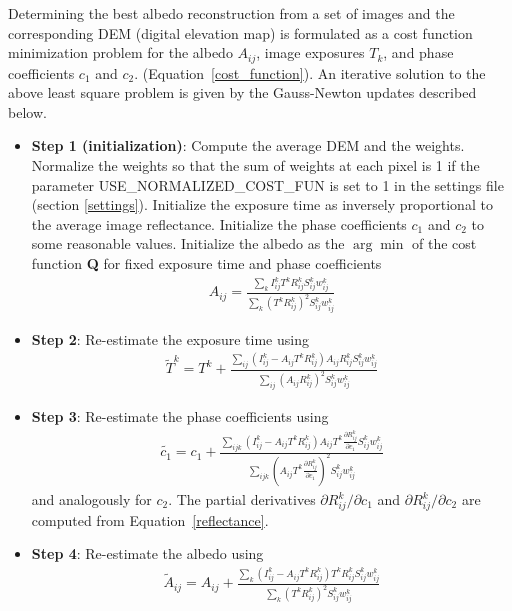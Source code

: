 \documentclass[letterpaper,fleqn,11pt]{report}
\begin{document}
Determining the best albedo reconstruction from a set of images and
the corresponding DEM (digital elevation map) is formulated as a cost function minimization
problem for the albedo $A_{ij}$, image exposures $T_k$, and phase
coefficients $c_1$ and $c_2.$ (Equation~\ref{cost_function}). An iterative solution to the above least square problem is given by the Gauss-Newton updates described below. 

\begin{itemize}
\item {\bf Step 1 (initialization)}: Compute the average DEM and the weights.
Normalize the weights so that the sum of weights at each pixel is 1 if the
parameter USE\_NORMALIZED\_COST\_FUN is set to 1 in the settings file
(section \ref{settings}). 
  Initialize the exposure time as inversely proportional to the average image
  reflectance. Initialize the phase coefficients $c_1$ and $c_2$ to some
  reasonable values. Initialize the albedo as the $\arg \min$ of the
  cost function {\bf Q} for fixed exposure time and phase
  coefficients 
\begin{eqnarray}
A_{ij} = \frac{\sum_k I_{ij}^k T^kR^k_{ij} S^k_{ij}w^k_{ij}}{\sum_k (T^k R^k_{ij})^2 S^k_{ij}w^k_{ij}}
\label{albedo_init}
\end{eqnarray}

\item {\bf Step 2}: Re-estimate the exposure time using
\begin{eqnarray}
\tilde{T} ^k = T^k + \frac{\sum_{ij} (I_{ij}^k-A_{ij}T^kR^k_{ij})A_{ij}R^k_{ij}S^k_{ij}w^k_{ij}}{\sum_{ij}(A_{ij} R^k_{ij})^2 S^k_{ij}w^k_{ij}}
\label{exposure_iter}
\end {eqnarray}

\item {\bf Step 3}: Re-estimate the phase coefficients using
\begin{eqnarray}
\tilde{c_1} = c_1 + \frac{\sum_{ijk}
  (I_{ij}^k-A_{ij}T^kR^k_{ij})A_{ij}T^k \frac{\partial R^k_{ij}}{\partial c_1}S^k_{ij}w^k_{ij}}{\sum_{ijk}\left(A_{ij}T^k\frac{\partial R^k_{ij}}{\partial c_1}\right)^2 S^k_{ij}w^k_{ij}}
\label{phasecoeff_iter}
\end {eqnarray}
and analogously for $c_2$. The partial derivatives $\partial
R^k_{ij}/\partial c_1$ and $\partial R^k_{ij}/\partial c_2$ are
computed from Equation~\ref{reflectance}.

\item {\bf Step 4}: Re-estimate the albedo using
\begin{eqnarray}
\tilde{A}_{ij}=A_{ij}+\frac{\sum_k (I_{ij}^k-A_{ij}T^kR^k_{ij}) T^kR^k_{ij}S^k_{ij}w^k_{ij}}{\sum_k (T^k R^k_{ij})^2 S^k_{ij}w^k_{ij}}
\label{albedo_iter}
\end {eqnarray}


\end{itemize}
\end{document}
